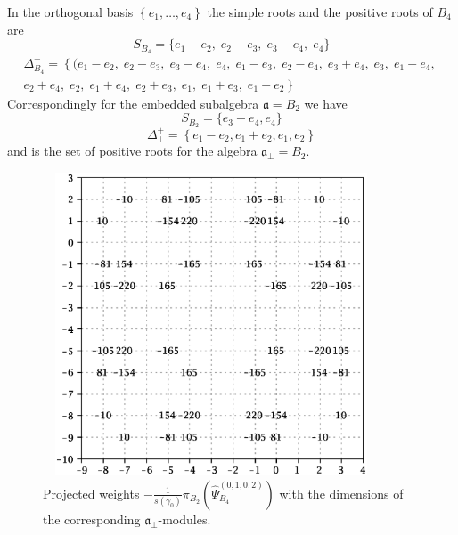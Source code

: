 \documentclass[12pt]{iopart}
\begin{document}
In the orthogonal basis $\left\{e_1,\dots,e_4\right\}$ the simple roots and the positive roots of $B_4$ are
\begin{equation}
  \label{eq:8}
 S_{B_4}= \{e_1 - e_2,\; e_2 - e_3,\; e_3 - e_4,\; e_4\}
\end{equation}
\begin{eqnarray*}
  \label{eq:19}
 \Delta^+_{B_4}=\left\{ (e_1 - e_2,\; e_2 - e_3,\; e_3 - e_4,\; e_4,\; e_1 - e_3,\; e_2 - e_4,\; e_3 + e_4,\; e_3,\; e_1 - e_4,\;\right.\\
 \left. e_2 + e_4,\; e_2,\; e_1 + e_4,\; e_2 + e_3,\; e_1,\; e_1 + e_3,\; e_1 + e_2\right\}
\end{eqnarray*}
Correspondingly for the embedded subalgebra $\mathfrak{a}=B_2$ we have
\begin{equation}
  \label{eq:26}
 S_{B_2}=\{e_3-e_4,e_4\}
\end{equation}
\begin{equation}
  \label{eq:27}
 \Delta^{+}_{\bot}= \left\{e_1-e_2,e_1+e_2,e_1,e_2\right\}
\end{equation}
and is the set of positive roots for the algebra $\mathfrak{a}_{\bot}=B_2$.
\begin{figure}[t]
  \centering
    \includegraphics[width=100mm,height=90mm]{figure4.eps}
  \caption{Projected weights $-\frac{1}{s(\gamma_0)}\pi_{B_2}\left(\hat \Psi^{(0,1,0,2)}_{B_4}\right)$ with the dimensions of the corresponding $\mathfrak{a}_{\bot}$-modules.}
  \label{fig:B4B2anom}
\end{figure}
\end{document}
